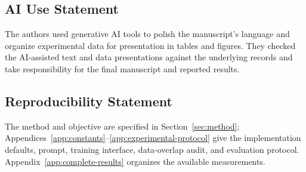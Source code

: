 \subsection*{AI Use Statement}
The authors used generative AI tools to polish the manuscript's language and
organize experimental data for presentation in tables and figures. They
checked the AI-assisted text and data presentations against the underlying
records and take responsibility for the final manuscript and reported results.

\subsection*{Reproducibility Statement}
The method and objective are specified in Section~\ref{sec:method};
Appendices~\ref{app:constants}--\ref{app:experimental-protocol} give the
implementation defaults, prompt, training interface, data-overlap audit, and
evaluation protocol.  Appendix~\ref{app:complete-results} organizes the
available measurements.
